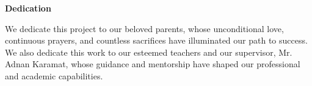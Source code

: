 
\clearpage


\vspace*{-0.15cm} 
{\centering
    {\fontsize{16pt}{20pt}\selectfont \textbf{Dedication} \par}
}
\vspace{0.5cm}

\noindent
We dedicate this project to our beloved parents, whose unconditional love, continuous prayers, and countless sacrifices have illuminated our path to success. We also dedicate this work to our esteemed teachers and our supervisor, Mr. Adnan Karamat, whose guidance and mentorship have shaped our professional and academic capabilities.
